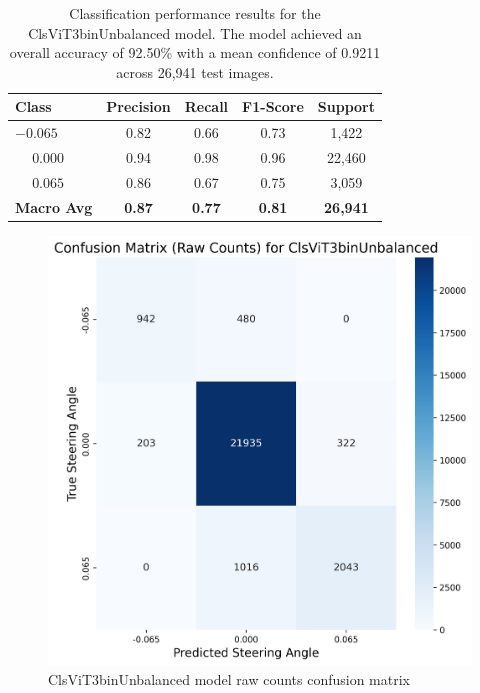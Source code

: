 \begin{table}[htbp]
\centering
\begin{tabular}{@{}lcccc@{}}
\toprule
\textbf{Class} & \textbf{Precision} & \textbf{Recall} & \textbf{F1-Score} & \textbf{Support} \\
\midrule
$-0.065$ & 0.82 & 0.66 & 0.73 & 1,422 \\
$\phantom{-}0.000$ & 0.94 & 0.98 & 0.96 & 22,460 \\
$\phantom{-}0.065$ & 0.86 & 0.67 & 0.75 & 3,059 \\
\midrule
\textbf{Macro Avg} & \textbf{0.87} & \textbf{0.77} & \textbf{0.81} & \textbf{26,941} \\
\bottomrule
\end{tabular}
\caption{Classification performance results for the ClsViT3binUnbalanced model. The model achieved an overall accuracy of 92.50\% with a mean confidence of 0.9211 across 26,941 test images.}
\label{tab:clf_report_ClsViT3binUnbalanced}
\end{table}

\begin{figure}[H]
\centering
\includegraphics[width=0.65\linewidth]{Figures/Results/cm_raw_ClsViT3binUnbalanced.png}
\caption{ClsViT3binUnbalanced model raw counts confusion matrix}
\label{fig:cm_raw_ClsViT3binUnbalanced}
\end{figure}

